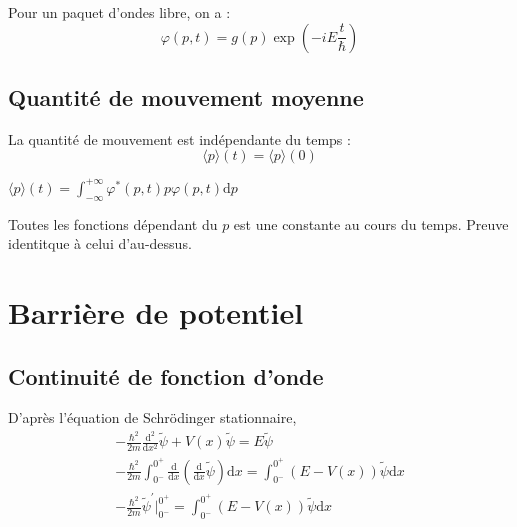 Pour un paquet d'ondes libre, on a :
\begin{equation}
  \varphi(p,t) = g(p) \exp \left( -i E \frac{t}{\hbar}  \right)
\end{equation}


\subsection{Quantité de mouvement moyenne} %
\label{sec:Quantité de mouvement moyenne}

La quantité de mouvement est indépendante du temps : 
\begin{equation}
  \langle p \rangle(t) = \langle p \rangle(0)
\end{equation}

\begin{myproof}{}{}$\langle p \rangle(t) = \int_{- \infty}^{+ \infty} \varphi ^{*}(p,t) p \varphi(p,t) \mathrm{d}p $
\end{myproof}

Toutes les fonctions dépendant du $p$ est une constante au cours du temps. Preuve identitque à celui d'au-dessus.

\newpage
\section{Barrière de potentiel} %
\label{sec:Barrière de potentiel}

\subsection{Continuité de fonction d'onde} %
\label{sub:Continuité de fonction d'onde}

D'après l'équation de Schrödinger stationnaire, 
\begin{gather}
  - \frac{\hbar ^{2}}{2m}  \frac{\mathrm{d} ^{2}}{ \mathrm{d}x ^{2}}  \widetilde{\psi} + V(x) \widetilde{\psi} = E \widetilde{\psi} \\
  - \frac{\hbar ^{2}}{2m}  \int_{0 ^{-}}^{0 ^{+}} \frac{\mathrm{d}}{\mathrm{d}x}  \left( \frac{\mathrm{d}}{\mathrm{d}x} \widetilde{ \psi} \right) \mathrm{d}x = \int_{0 ^{-}}^{0 ^{+}} (E -V(x)) \widetilde{\psi} \mathrm{d}x \\ 
  - \frac{\hbar ^{2}}{2m}  \widetilde{ \psi} ^{'} | _{0 ^{-}}  ^{0 ^{+}} = \int_{0 ^{-}}^{0 ^{+}} ( E- V(x)) \widetilde{ \psi} \mathrm{d} x
\end{gather} 

